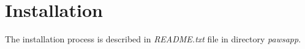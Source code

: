 \section{Installation}
\label{installation}

The installation process is described in \emph{README.txt} file in
directory \emph{pawsapp}.


